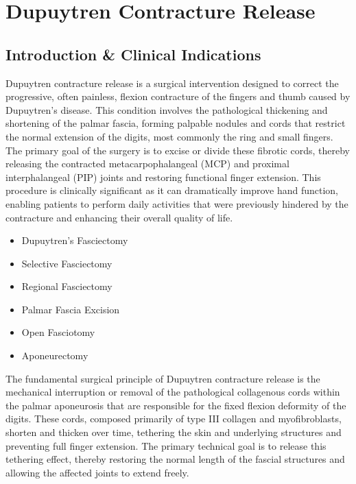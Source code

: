 \chapter{Dupuytren Contracture Release}

\section*{Introduction \& Clinical Indications}
Dupuytren contracture release is a surgical intervention designed to correct the progressive, often painless, flexion contracture of the fingers and thumb caused by Dupuytren's disease. This condition involves the pathological thickening and shortening of the palmar fascia, forming palpable nodules and cords that restrict the normal extension of the digits, most commonly the ring and small fingers. The primary goal of the surgery is to excise or divide these fibrotic cords, thereby releasing the contracted metacarpophalangeal (MCP) and proximal interphalangeal (PIP) joints and restoring functional finger extension. This procedure is clinically significant as it can dramatically improve hand function, enabling patients to perform daily activities that were previously hindered by the contracture and enhancing their overall quality of life.

\begin{itemize}
  \item Dupuytren's Fasciectomy
  \item Selective Fasciectomy
  \item Regional Fasciectomy
  \item Palmar Fascia Excision
  \item Open Fasciotomy
  \item Aponeurectomy
\end{itemize}

The fundamental surgical principle of Dupuytren contracture release is the mechanical interruption or removal of the pathological collagenous cords within the palmar aponeurosis that are responsible for the fixed flexion deformity of the digits. These cords, composed primarily of type III collagen and myofibroblasts, shorten and thicken over time, tethering the skin and underlying structures and preventing full finger extension. The primary technical goal is to release this tethering effect, thereby restoring the normal length of the fascial structures and allowing the affected joints to extend freely.

